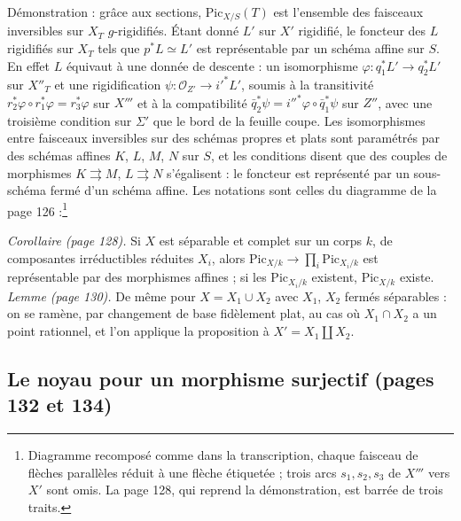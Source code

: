\documentclass[11pt,a4paper]{article}
\begin{document}
Démonstration : grâce aux sections, $\mathrm{Pic}_{X/S}(T)$ est l'ensemble des
faisceaux inversibles sur $X_T$ $g$-rigidifiés. Étant donné $L'$ sur $X'$
rigidifié, le foncteur des $L$ rigidifiés sur $X_T$ tels que $p^*L \simeq L'$
est représentable par un schéma affine sur $S$. En effet $L$ équivaut à une
donnée de descente : un isomorphisme $\varphi \colon q_1^*L' \to q_2^*L'$ sur
$X''_T$ et une rigidification $\psi \colon \mathcal{O}_{Z'} \to i'^*L'$,
soumis à la transitivité $r_2^*\varphi \circ r_1^*\varphi = r_3^*\varphi$ sur
$X'''$ et à la compatibilité
$\bar q_2^*\psi = i''^*\varphi \circ \bar q_1^*\psi$ sur $Z''$, avec une
troisième condition sur $\Sigma'$ que le bord de la feuille coupe. Les
isomorphismes entre faisceaux inversibles sur des schémas propres et plats
sont paramétrés par des schémas affines $K$, $L$, $M$, $N$ sur $S$, et les
conditions disent que des couples de morphismes $K \rightrightarrows M$,
$L \rightrightarrows N$ s'égalisent : le foncteur est représenté par un
sous-schéma fermé d'un schéma affine. Les notations sont celles du diagramme
de la page 126 :\footnote{Diagramme recomposé comme dans la transcription, chaque faisceau de
flèches parallèles réduit à une flèche étiquetée ; trois arcs $s_1, s_2, s_3$
de $X'''$ vers $X'$ sont omis. La page 128, qui reprend la démonstration, est
barrée de trois traits.}


\emph{Corollaire (page 128).} Si $X$ est séparable et complet sur un corps $k$,
de composantes irréductibles réduites $X_i$, alors
$\mathrm{Pic}_{X/k} \to \prod_i \mathrm{Pic}_{X_i/k}$ est représentable par
des morphismes affines ; si les $\mathrm{Pic}_{X_i/k}$ existent,
$\mathrm{Pic}_{X/k}$ existe. \emph{Lemme (page 130).} De même pour
$X = X_1 \cup X_2$ avec $X_1$, $X_2$ fermés séparables : on se ramène, par
changement de base fidèlement plat, au cas où $X_1 \cap X_2$ a un point
rationnel, et l'on applique la proposition à $X' = X_1 \amalg X_2$.

\subsection*{Le noyau pour un morphisme surjectif (pages 132 et 134)}
\end{document}
